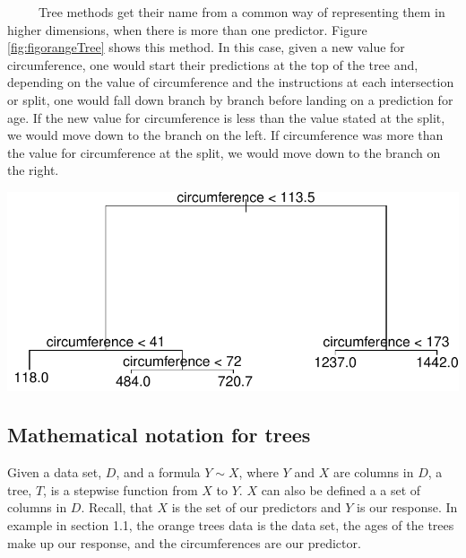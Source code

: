 \documentclass[12pt,twoside]{reedthesis}
\let\origfigure\figure
\let\endorigfigure\endfigure
\renewenvironment{figure}[1][2] {
    \expandafter\origfigure\expandafter[H]
} {
    \endorigfigure
}
\begin{document}
  ~~~~~Tree methods get their name from a common way of representing them
  in higher dimensions, when there is more than one predictor. Figure
  \ref{fig:figorangeTree} shows this method. In this case, given a new
  value for circumference, one would start their predictions at the top of
  the tree and, depending on the value of circumference and the
  instructions at each intersection or split, one would fall down branch
  by branch before landing on a prediction for age. If the new value for
  circumference is less than the value stated at the split, we would move
  down to the branch on the left. If circumference was more than the value
  for circumference at the split, we would move down to the branch on the
  right.
  
  \begin{figure}[H]
  
  {\centering \includegraphics{Thesis_files/figure-latex/unnamed-chunk-7-1} 
  
  }
  
  \caption{\label{fig:figorangeTree}A tree representing age \(\sim\) trunk circumference in orange trees.}\label{fig:unnamed-chunk-7}
  \end{figure}
  
  \subsection{Mathematical notation for
  trees}\label{mathematical-notation-for-trees}
  
  Given a data set, \(D\), and a formula \(Y \sim X\), where \(Y\) and
  \(X\) are columns in \(D\), a tree, \(T\), is a stepwise function from
  \(X\) to \(Y\). \(X\) can also be defined a a set of columns in \(D\).
  Recall, that \(X\) is the set of our predictors and \(Y\) is our
  response. In example in section 1.1, the orange trees data is the data
  set, the ages of the trees make up our response, and the circumferences
  are our predictor.
  
\end{document}
